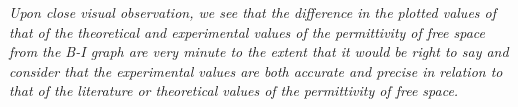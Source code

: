         \textit{Upon close visual observation, we see that the difference in the plotted values of that of the theoretical and experimental values of the permittivity of free space from the B-I graph are very minute to the extent that it would be right to say and consider that the experimental values are both accurate and precise in relation to that of the literature or theoretical values of the permittivity of free space.}

